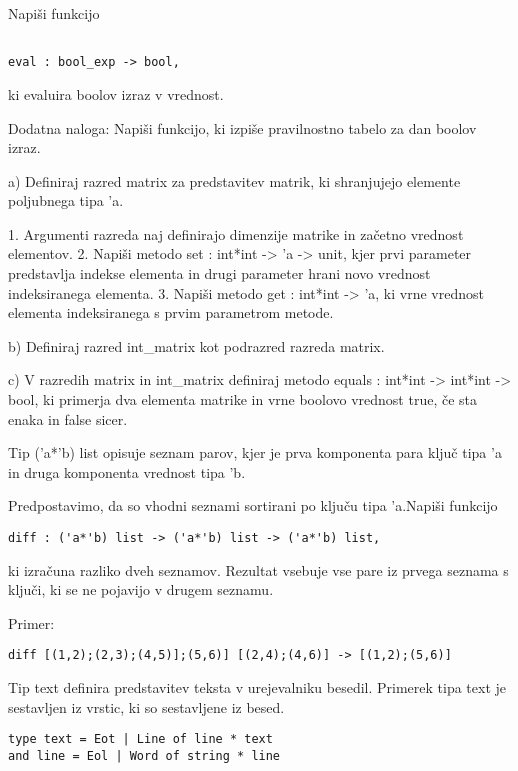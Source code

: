 \begin{ex}
\begin{verbatim}
\end{verbatim}
Napi\v si funkcijo
\begin{verbatim}

eval : bool_exp -> bool, 
\end{verbatim}

ki evaluira boolov izraz v vrednost.   

Dodatna naloga:  Napi\v si funkcijo, ki izpi\v se pravilnostno tabelo za dan boolov izraz.


\end{ex} \begin{ex}
a) Definiraj razred matrix za predstavitev matrik, ki shranjujejo elemente poljubnega tipa 'a. 

    1. Argumenti razreda naj definirajo dimenzije matrike in za\v cetno vrednost elementov. 
    2. Napi\v si metodo set : int*int -> 'a -> unit, kjer prvi parameter predstavlja indekse elementa in drugi parameter hrani novo vrednost indeksiranega elementa. 
    3. Napi\v si metodo get : int*int -> 'a, ki vrne vrednost elementa indeksiranega s prvim parametrom metode. 
       
b) Definiraj razred int\_matrix kot podrazred razreda matrix.

c) V razredih matrix in int\_matrix definiraj metodo equals : int*int -> int*int -> bool, ki primerja dva elementa matrike in vrne boolovo vrednost true, \v ce sta enaka in false sicer. 


\end{ex} \begin{ex}
Tip ('a*'b) list opisuje seznam parov, kjer je prva komponenta para klju\v c tipa 'a in druga komponenta vrednost tipa 'b. 

Predpostavimo, da so vhodni seznami sortirani po klju\v cu tipa 'a.Napi\v si funkcijo

\begin{verbatim}
diff : ('a*'b) list -> ('a*'b) list -> ('a*'b) list,
\end{verbatim}

ki izra\v cuna razliko dveh seznamov. Rezultat vsebuje vse pare iz prvega seznama s klju\v ci, ki se ne pojavijo v drugem seznamu. 

Primer:    
\begin{verbatim}
diff [(1,2);(2,3);(4,5)];(5,6)] [(2,4);(4,6)] -> [(1,2);(5,6)]
\end{verbatim}


\end{ex} \begin{ex}
Tip text definira predstavitev teksta v urejevalniku besedil. Primerek tipa text je sestavljen iz vrstic, ki so sestavljene iz besed.  
\begin{verbatim}
type text = Eot | Line of line * text
and line = Eol | Word of string * line
\end{verbatim}


\end{ex}
